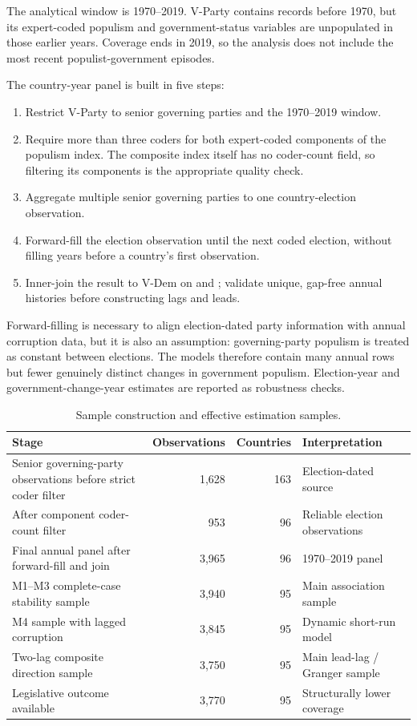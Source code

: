 The analytical window is 1970--2019. V-Party contains records before 1970, but its expert-coded
populism and government-status variables are unpopulated in those earlier years. Coverage ends in
2019, so the analysis does not include the most recent populist-government episodes.

The country-year panel is built in five steps:

\begin{enumerate}
  \item Restrict V-Party to senior governing parties and the 1970--2019 window.
  \item Require more than three coders for both expert-coded components of the populism index. The
  composite index itself has no coder-count field, so filtering its components is the appropriate
  quality check.
  \item Aggregate multiple senior governing parties to one country-election observation.
  \item Forward-fill the election observation until the next coded election, without filling years
  before a country's first observation.
  \item Inner-join the result to V-Dem on  and ; validate unique,
  gap-free annual histories before constructing lags and leads.
\end{enumerate}

Forward-filling is necessary to align election-dated party information with annual corruption data,
but it is also an assumption: governing-party populism is treated as constant between elections. The
models therefore contain many annual rows but fewer genuinely distinct changes in government
populism. Election-year and government-change-year estimates are reported as robustness checks.

\begin{table}[H]
\centering
\caption{Sample construction and effective estimation samples.}
\label{tab:sample}
\small
\begin{tabularx}{0.9\textwidth}{Yrrl}
\toprule
Stage & Observations & Countries & Interpretation \\
\midrule
Senior governing-party observations before strict coder filter & 1,628 & 163 & Election-dated source \\
After component coder-count filter & 953 & 96 & Reliable election observations \\
Final annual panel after forward-fill and join & 3,965 & 96 & 1970--2019 panel \\
M1--M3 complete-case stability sample & 3,940 & 95 & Main association sample \\
M4 sample with lagged corruption & 3,845 & 95 & Dynamic short-run model \\
Two-lag composite direction sample & 3,750 & 95 & Main lead-lag / Granger sample \\
Legislative outcome available & 3,770 & 95 & Structurally lower coverage \\
\bottomrule
\end{tabularx}
\end{table}

